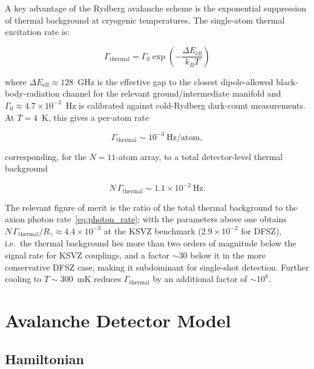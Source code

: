 A key advantage of the Rydberg avalanche scheme is the exponential suppression of thermal background at cryogenic temperatures. The single-atom thermal excitation rate is:

\begin{equation}
    \Gamma_{\mathrm{thermal}} = \Gamma_0 \exp\left(-\frac{\Delta E_{\mathrm{eff}}}{k_B T}\right)
    \label{eq:thermal_rate}
\end{equation}

where $\Delta E_{\mathrm{eff}}\!\approx\!128$~GHz is the effective gap to the closest dipole-allowed black-body-radiation channel for the relevant ground/intermediate manifold and $\Gamma_0\!\approx\!4.7\!\times\!10^{-3}$~Hz is calibrated against cold-Rydberg dark-count measurements. At $T\!=\!4$~K, this gives a per-atom rate

\begin{equation}
    \Gamma_{\mathrm{thermal}} \sim 10^{-3}~\text{Hz/atom},
    \label{eq:thermal_rate_4k}
\end{equation}

corresponding, for the $N\!=\!11$-atom array, to a total detector-level thermal background

\begin{equation}
    N\,\Gamma_{\mathrm{thermal}} \sim 1.1\!\times\!10^{-2}~\text{Hz}.
    \label{eq:thermal_rate_total}
\end{equation}

The relevant figure of merit is the ratio of the total thermal background to the axion photon rate~\eqref{eq:photon_rate}; with the parameters above one obtains $N\,\Gamma_{\mathrm{thermal}}/R_\gamma \approx 4.4\times10^{-3}$ at the KSVZ benchmark ($2.9\times10^{-2}$ for DFSZ), i.e.\ the thermal background lies more than two orders of magnitude below the signal rate for KSVZ couplings, and a factor $\sim\!30$ below it in the more conservative DFSZ case, making it subdominant for single-shot detection. Further cooling to $T\!\sim\!300$~mK reduces $\Gamma_{\mathrm{thermal}}$ by an additional factor of $\sim\!10^{8}$.

\section{Avalanche Detector Model}
\label{sec:axion_theoretical_framework}

\subsection*{Hamiltonian}

